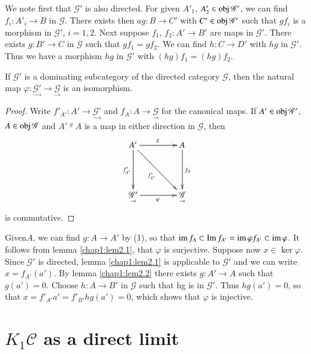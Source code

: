 We note first that $\mathscr{G}'$ is also directed. For given $A'_1$,
$A'_2 \in \operatorname{obj} \mathscr{G}'$, we can find $f_i : A'_i \to B$ in
$\mathscr{G}$. There exists then $a g : B \to C'$ with $C' \in \operatorname{obj}
\mathscr{G}'$ such that $gf_i$ is a morphism in $\mathscr{G}'$, $i =
1, 2$. Next suppose $f_1$, $f_2 : A' \to B'$ are maps in
$\mathscr{G}'$. There exists $g : B' \to C$ in $\mathscr{G}$ such that
$gf_1 = gf_2$. We can find $h : C \to D'$ with $hg$ in
$\mathscr{G}'$. Thus we have a morphism $hg$ in $\mathscr{G}'$ with
$(hg) f_1 = (hg)f_2$. 

\setcounter{prop}{2}
\begin{prop}\label{chap1:prop2.3} %
If $\mathscr{G}'$ is a dominating subcategory of the directed category
$\mathscr{G}$, then the natural map $\varphi : \underset \to
{\mathscr{G}'} \to \underset \to {\mathscr{G}}$ is an isomorphism. 
\end{prop}

\begin{proof}
Write $f'_{A'} : A' \to \underset \to {\mathscr{G}'}$ and $f_A : A \to
\underset \to {\mathscr{G}}$ for the canonical maps. If $A' \in \operatorname{obj}
\mathscr{G}'$, $A \in \operatorname{obj} \mathscr{G}$ and $A'
\displaystyle{\mathop{\underline{\quad}}^g} A$ is a 
map in either direction in $\mathscr{G}$, then 
\[
\xymatrix@C=1.5cm@R=1.5cm{
A' \ar[r]^g \ar[d]_{f'_{A'}} \ar[dr]_{f'_{A'}} & A \ar[d]^{f_A} \\
\underset{\to}{\mathscr{G}'} \ar[r]_{\varphi} & \underset{\to}{\mathscr{G}}
}
\]
is commutative.
\end{proof}

Given\pageoriginale $A$, we can find $g : A \to A'$ by (1), so that $\operatorname{im}
f_A \subset 
\operatorname{Im} f_{A'} = \operatorname{im} \varphi f_{A'} \subset \operatorname{im} \varphi$. It follows from lemma
\ref{chap1:lem2.1}, that $\varphi$ is surjective. Suppose now $x \in \ker
\varphi$. Since $\mathscr{G}'$ is directed, lemma \ref{chap1:lem2.1}
is applicable to 
$\mathscr{G'}$ and we can write $x = f_{A'}(a')$. By lemma
\ref{chap1:lem2.2} there 
exists $g : A' \to A$ such that $g(a') = 0$. Choose $h : A \to B'$ in
$\mathscr{G}$ such that hg is in $\mathscr{G'}$. Thus $hg(a') = 0$,
so that $x = f'_{A'}a' = f'_{B'} hg (a') = 0$, which shows that
$\varphi$ is injective. 


\section{$K_1 \mathscr{C}$ as a direct limit}\label{chap1:sec3}%

